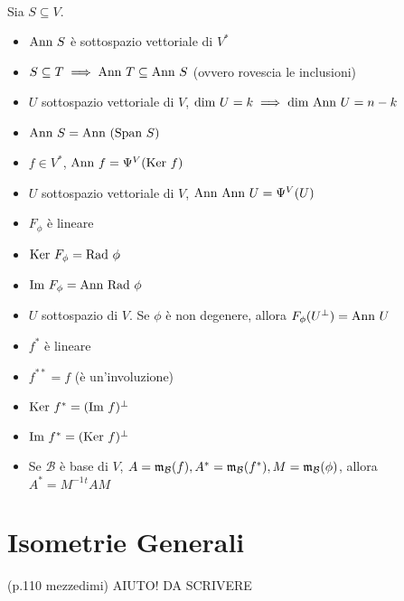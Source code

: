 \documentclass[a4paper,NoNotes,GeneralMath]{stdmdoc}
\newcommand{\Help}{{\color{green} AIUTO! DA SCRIVERE}}
\begin{document}
	 \\ Sia $S \subseteq V$.
	\begin{itemize}
		\item $\mbox{Ann } S$ è sottospazio vettoriale di $V^{*}$
		\item $S \subseteq T \implies \mbox{Ann } T \subseteq \mbox{Ann } S$ (ovvero rovescia le inclusioni)
		\item $U$ sottospazio vettoriale di $V$, $\mbox{dim } U = k \implies \mbox{dim } \mbox{Ann } U = n - k$
		\item $\mbox{Ann } S = \mbox{Ann } (\mbox{Span } S)$
		\item $f \in V^{*}$, $\mbox{Ann } f = \Psi^{V}(\mbox{Ker } f)$
		\item $U$ sottospazio vettoriale di $V$, $\mbox{Ann } \mbox{Ann } U = \Psi^{V} (U)$
	\end{itemize}

	\begin{itemize}
		\item $F_{\phi}$ è lineare
		\item $\mbox{Ker } F_{\phi} = \mbox{Rad } \phi$
		\item $\mbox{Im } F_{\phi} = \mbox{Ann } \mbox{Rad } \phi$
		\item $U$ sottospazio di $V$. Se $\phi$ è non degenere, allora $F_{\phi}(U^\bot) = \mbox{Ann } U$
	\end{itemize}

	\begin{itemize}
		\item $f^{*}$ è lineare
		\item $f^{**} = f$ (è un'involuzione)
		\item $\mbox{Ker } f^{*} = (\mbox{Im } f)^\bot$
		\item $\mbox{Im } f^{*} = (\mbox{Ker } f)^\bot$
		\item Se $\mathcal{B}$ è base di $V$, $A = \mathfrak{m}_{\mathcal{B}}(f), A^{*} = \mathfrak{m}_{\mathcal{B}}(f^{*}), M = \mathfrak{m}_{\mathcal{B}}(\phi)$, allora $A^{*} = M^{-1}{}^tAM$
	\end{itemize}

	\section*{Isometrie Generali} (p.110 mezzedimi)
	\Help
\end{document}
